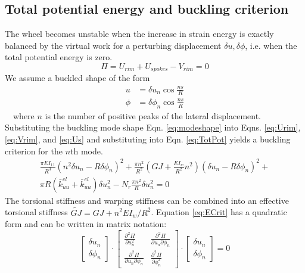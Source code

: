 \documentclass{bmd2016p}
\begin{document}
\subsection{Total potential energy and buckling criterion}
The wheel becomes unstable when the increase in strain energy is exactly balanced by the virtual work for a perturbing displacement $\delta u, \delta\phi$, i.e. when the total potential energy is zero.
	\begin{equation}\label{eq:TotPot}
	\Pi = U_{rim} + U_{spokes} - V_{rim} = 0
	\end{equation}
We assume a buckled shape of the form
	\begin{equation}\label{eq:modeshape}
	\begin{split}
	u &= \delta u_n \cos{\frac{ns}{R}} \\
	\phi &= \delta\phi_n \cos{\frac{ns}{R}}
	\end{split}
	\end{equation}
\,\,\,\, where $n$ is the number of positive peaks of the lateral displacement. Substituting the buckling mode shape Eqn. \ref{eq:modeshape} into Eqns. \ref{eq:Urim}, \ref{eq:Vrim}, and \ref{eq:Us} and substituting into Eqn. \ref{eq:TotPot} yields a buckling criterion for the $n$th mode.
	\begin{multline}\label{eq:ECrit}
	\frac{\pi EI_{11}}{R^3}(n^2 \delta u_n - R\delta\phi_n)^2 + \frac{\pi n^2}{R^2}\left(GJ + \frac{EI_w}{R^2}n^2\right)(\delta u_n-R\delta\phi_n)^2 + \\
	\pi R(\bar{k}_{uu}^{el} + \bar{k}_{uu}^{el})\delta u_n^2 - N_r\frac{\pi n^2}{R}\delta u_n^2=0
	\end{multline}
The torsional stiffness and warping stiffness can be combined into an effective torsional stiffness $\widetilde{GJ} = GJ + n^2EI_w/R^2$. Equation \ref{eq:ECrit} has a quadratic form and can be written in matrix notation:
	\begin{equation}\label{eq:Qform}
	\begin{bmatrix}
	\delta u_n\\\delta\phi_n
	\end{bmatrix} \cdot
	\begin{bmatrix}
	\frac{\partial^2 \Pi}{\partial u_n^2} & \frac{\partial^2 \Pi}{\partial u_n \partial \phi_n}\\
	\frac{\partial^2 \Pi}{\partial u_n\partial\phi_n} & \frac{\partial^2 \Pi}{\partial \phi_n^2}
	\end{bmatrix} \cdot
	\begin{bmatrix}
	\delta u_n\\\delta\phi_n
	\end{bmatrix}
	=0
	\end{equation}
\end{document}

